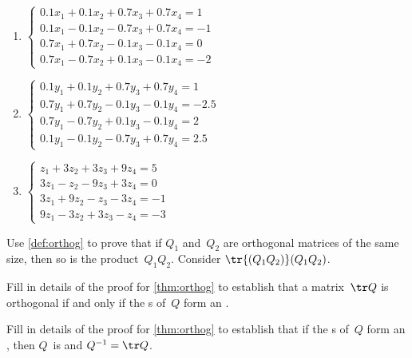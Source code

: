 \begin{exercise}
\begin{enumerate}
\item \(\begin{cases}
0.1x_1+0.1x_2+0.7x_3+0.7x_4=1
\\0.1x_1-0.1x_2-0.7x_3+0.7x_4=-1
\\0.7x_1+0.7x_2-0.1x_3-0.1x_4=0
\\0.7x_1-0.7x_2+0.1x_3-0.1x_4=-2
\end{cases}\)

\item \(\begin{cases}
0.1y_1+0.1y_2+0.7y_3+0.7y_4=1
\\0.7y_1+0.7y_2-0.1y_3-0.1y_4=-2.5
\\0.7y_1-0.7y_2+0.1y_3-0.1y_4=2
\\0.1y_1-0.1y_2-0.7y_3+0.7y_4=2.5
\end{cases}\)

\item \(\begin{cases}
  z_1+3z_2+3z_3+9z_4=5
\\3z_1-z_2-9z_3+3z_4=0
\\3z_1+9z_2-z_3-3z_4=-1
\\9z_1-3z_2+3z_3-z_4=-3
\end{cases}\)

\end{enumerate}
\end{exercise}




\begin{exercise}\label{ex:orthoprod} 
Use \autoref{def:orthog} to prove that if \(Q_1\) and~\(Q_2\) are orthogonal matrices of the same size, then so is the product~\(Q_1Q_2\). 
Consider \(\tr{(Q_1Q_2)}(Q_1Q_2)\).
\end{exercise}

\begin{exercise} \label{ex:} 
Fill in details of the proof for \autoref{thm:orthog} to establish 
that a matrix~\(\tr Q\) is orthogonal if and 
only if the s of~\(Q\) form an .
\end{exercise}

\begin{exercise} \label{ex:} 
Fill in details of the proof for \autoref{thm:orthog} to establish that if the s of~\(Q\) form an , then \(Q\)~is  and \(Q^{-1}=\tr Q\).
\end{exercise}



